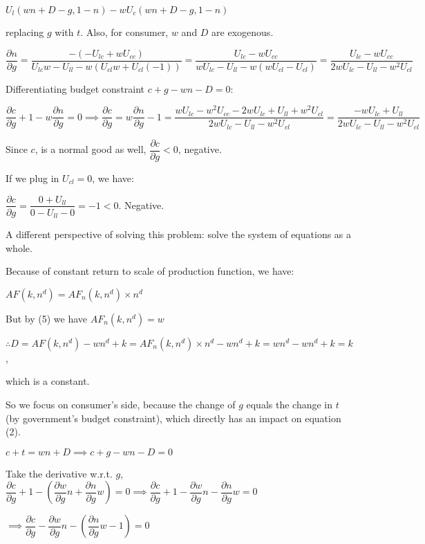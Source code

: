 \documentclass{article}
\begin{document}
$U_{l}\left(wn+D-g, 1-n\right)-wU_{c}\left(wn+D-g, 1-n\right)$

replacing $g$ with $t$. Also, for consumer, $w$ and $D$ are exogenous.

$\dfrac{\partial n}{\partial g}=\dfrac{-\left(-U_{lc}+wU_{cc}\right)}{U_{lc}w-U_{ll}-w\left(U_{cl}w+U_{cl}\left(-1\right)\right)}=\dfrac{U_{lc}-wU_{cc}}{wU_{lc}-U_{ll}-w\left(wU_{cl}-U_{cl}\right)}=\dfrac{U_{lc}-wU_{cc}}{2wU_{lc}-U_{ll}-w^{2}U_{cl}}$

Differentiating budget constraint $c+g-wn-D=0$:

$\dfrac{\partial c}{\partial g}+1-w\dfrac{\partial n}{\partial g}=0\implies\dfrac{\partial c}{\partial g}=w\dfrac{\partial n}{\partial g}-1=\dfrac{wU_{lc}-w^{2}U_{cc}-2wU_{lc}+U_{ll}+w^{2}U_{cl}}{2wU_{lc}-U_{ll}-w^{2}U_{cl}}=\dfrac{-wU_{lc}+U_{ll}}{2wU_{lc}-U_{ll}-w^{2}U_{cl}}$

Since $c$, is a normal good as well, $\dfrac{\partial c}{\partial g}<0$, negative.

If we plug in $U_{cl}=0$, we have:

$\dfrac{\partial c}{\partial g}=\dfrac{0+U_{ll}}{0-U_{ll}-0}=\boxed{-1<0}.$ Negative.

A different perspective of solving this problem: solve the system of equations as a whole.

Because of constant return to scale of production function, we have:

$AF\left(k,n^{d}\right)=AF_{n}\left(k,n^{d}\right)\times n^{d}$

But by (5) we have $AF_{n}\left(k,n^{d}\right)=w$

$\therefore D=AF\left(k,n^{d}\right)-wn^{d}+k=AF_{n}\left(k,n^{d}\right)\times n^{d}-wn^{d}+k=wn^{d}-wn^{d}+k=k$,

which is a constant.

So we focus on consumer's side, because the change of $g$ equals the change in $t$ (by government's budget constraint), which directly has an impact on equation (2).

$c+t=wn+D\implies c+g-wn-D=0$

Take the derivative w.r.t. $g$,\\

$\dfrac{\partial c}{\partial g}+1-\left(\dfrac{\partial w}{\partial g}n+\dfrac{\partial n}{\partial g}w\right)=0\implies\dfrac{\partial c}{\partial g}+1-\dfrac{\partial w}{\partial g}n-\dfrac{\partial n}{\partial g}w=0$

$\implies\dfrac{\partial c}{\partial g}-\dfrac{\partial w}{\partial g}n-\left(\dfrac{\partial n}{\partial g}w-1\right)=0$
\end{document}
